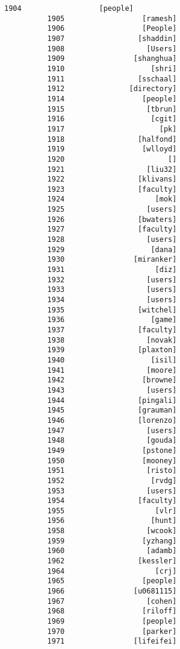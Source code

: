 \documentclass[11pt]{article}
\begin{document}
\begin{Verbatim}[commandchars=\\\{\}]
          1904                  [people]
          1905                  [ramesh]
          1906                  [People]
          1907                 [shaddin]
          1908                   [Users]
          1909                [shanghua]
          1910                    [shri]
          1911                 [sschaal]
          1912               [directory]
          1914                  [people]
          1915                   [tbrun]
          1916                    [cgit]
          1917                      [pk]
          1918                 [halfond]
          1919                  [wlloyd]
          1920                        []
          1921                   [liu32]
          1922                 [klivans]
          1923                 [faculty]
          1924                     [mok]
          1925                   [users]
          1926                 [bwaters]
          1927                 [faculty]
          1928                   [users]
          1929                    [dana]
          1930                [miranker]
          1931                     [diz]
          1932                   [users]
          1933                   [users]
          1934                   [users]
          1935                 [witchel]
          1936                    [game]
          1937                 [faculty]
          1938                   [novak]
          1939                 [plaxton]
          1940                    [isil]
          1941                   [moore]
          1942                  [browne]
          1943                   [users]
          1944                 [pingali]
          1945                 [grauman]
          1946                 [lorenzo]
          1947                   [users]
          1948                   [gouda]
          1949                  [pstone]
          1950                  [mooney]
          1951                   [risto]
          1952                    [rvdg]
          1953                   [users]
          1954                 [faculty]
          1955                     [vlr]
          1956                    [hunt]
          1958                   [wcook]
          1959                  [yzhang]
          1960                   [adamb]
          1962                 [kessler]
          1964                     [crj]
          1965                  [people]
          1966                [u0681115]
          1967                   [cohen]
          1968                  [riloff]
          1969                  [people]
          1970                  [parker]
          1971                [lifeifei]

\end{Verbatim}
\end{document}
